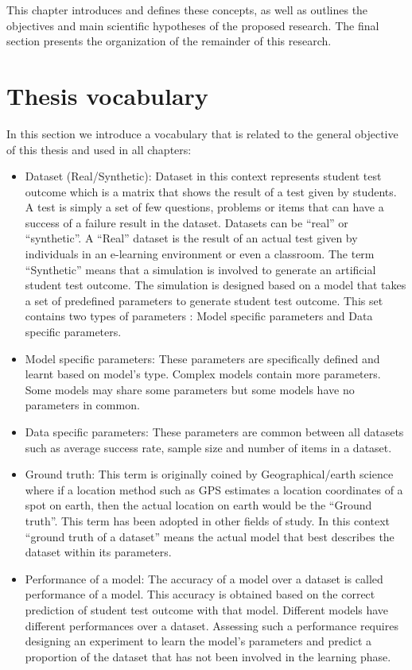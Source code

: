 This chapter introduces and defines these concepts, as well as outlines the objectives and main scientific hypotheses of the proposed research. The final section presents the organization of the remainder of this research.

\section{Thesis vocabulary}

In this section we introduce a vocabulary that is related to the general objective of this thesis and used in all chapters:

\begin{itemize}
\item Dataset (Real/Synthetic): Dataset in this context represents student test outcome which is a matrix that shows the result of a test given by students. A test is simply a set of few questions, problems or items that can have a success of a failure result in the dataset. Datasets can be ``real'' or ``synthetic''. A ``Real'' dataset is the result of an actual test given by individuals in an e-learning environment or even a classroom. The term ``Synthetic'' means that a simulation is involved to generate an artificial student test outcome. The simulation is designed based on a model that takes a set of predefined parameters to generate student test outcome. This set contains two types of parameters : Model specific parameters and Data specific parameters.
\item Model specific parameters: These parameters are specifically defined and learnt based on model's type. Complex models contain more parameters. Some models may share some parameters but some models have no parameters in common.
\item Data specific parameters: These parameters are common between all datasets such as average success rate, sample size and number of items in a dataset.
\item Ground truth: This term is originally coined by Geographical/earth science where if a location method such as GPS estimates a location coordinates of a spot on earth, then the actual location on earth would be the ``Ground truth''. This term has been adopted in other fields of study. In this context ``ground truth of a dataset'' means the actual model that best describes the dataset within its parameters.
\item Performance of a model: The accuracy of a model over a dataset is called performance of a model. This accuracy is obtained based on the correct prediction of student test outcome with that model. Different models have different performances over a dataset. Assessing such a performance requires designing an experiment to learn the model's parameters and predict a proportion of the dataset that has not been involved in the learning phase.

\end{itemize}

